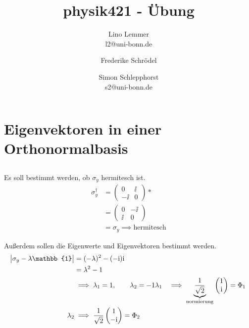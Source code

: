 

\setcounter{thezettel}{8}
\renewcommand\thesection{\arabic{thezettel}.\arabic{section}}

\newcommand{\ui}[1]{\int_{-\infty}^{\infty}\dif {#1}\;}
\newcommand\ccancel[2][black]{\renewcommand\CancelColor{\color{#1}}\cancel{#2}}


\title{physik421 - Übung }
\author{Lino Lemmer \\ \small{l2@uni-bonn.de} \and Frederike Schrödel \and Simon Schlepphorst\\ \small{s2@uni-bonn.de}}


\maketitle

\section{Eigenvektoren in einer Orthonormalbasis}
\subsection{}
Es soll bestimmt werden, ob $\sigma_y$ hermitesch ist.
\begin{align*}
    \sigma^\dagger_y &= 
    \begin{pmatrix}
        0 &\ii \\
        -\ii &0
    \end{pmatrix}* \\
    &= \begin{pmatrix}
        0 &-\ii \\
        \ii &0
    \end{pmatrix} \\
    &= \sigma_y \implies \text{hermitesch}
\end{align*}

Außerdem sollen die Eigenwerte und Eigenvektoren bestimmt werden.
\begin{align*}
    \abs{\sigma_y-\lambda\mathbb{1}} &= (-\lambda)^2-(-\ii)\ii \\
                                    &= \lambda^2-1 \\
                                    &\implies \lambda_1 =1, \qquad \lambda_2 = -1
    \lambda_1 &\implies \underbrace{\frac{1}{\sqrt{2}}}_\text{normierung}\begin{pmatrix}
        1 \\ \ii
    \end{pmatrix} = \Phi_1\\
    \lambda_2 &\implies \frac 1{\sqrt 2}\begin{pmatrix}
        1 \\ -\ii
    \end{pmatrix} = \Phi_2
\end{align*}

